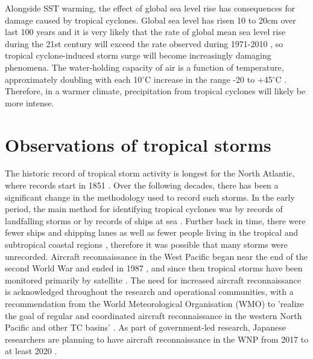 Alongside SST warming, the effect of global sea level rise has consequences for damage caused by tropical cyclones. Global sea level has risen 10 to 20cm over last 100 years \citep{solomon2007climate} and it is very likely that the rate of global mean sea level rise during the 21st century will exceed the rate observed during 1971-2010 \citep{church2013sea}, so tropical cyclone-induced storm surge will become increasingly damaging phenomena. The water-holding capacity of air is a function of temperature, approximately doubling with each 10$^{\circ}$C increase in the range -20 to +45$^{\circ}$C \citep{fowler1995potential}. Therefore, in a warmer climate, precipitation from tropical cyclones will likely be more intense.




\section{Observations of tropical storms}
The historic record of tropical storm activity is longest for the North Atlantic, where records start in 1851 \citep{landsea2004atlantic}. Over the following decades, there has been a significant change in the methodology used to record such storms. In the early period, the main method for identifying tropical cyclones was by records of landfalling storms or by records of ships at sea \citep{vecchi2008estimates}. Further back in time, there were fewer ships and shipping lanes as well as fewer people living in the tropical and subtropical coastal regions \citep{landsea2007counting}, therefore it was possible that many storms were unrecorded. Aircraft reconnaissance in the West Pacific began near the end of the second World War and ended in 1987 \citep{knapp2013pressure}, and since then tropical storms have been monitored primarily by satellite \citep{lander1994exploratory}. The need for increased aircraft reconnaissance is acknowledged throughout the research and operational communities, with a recommendation from the World Meteorological Organisation (WMO) to 'realize the goal of regular and coordinated aircraft reconnaissance in the western North Pacific and other TC basins' \citep{wmoitwc8}. As part of government-led research, Japanese researchers are planning to have aircraft reconnaissance in the WNP from 2017 to at least 2020 \citep{nhkhurricanehunter}.

